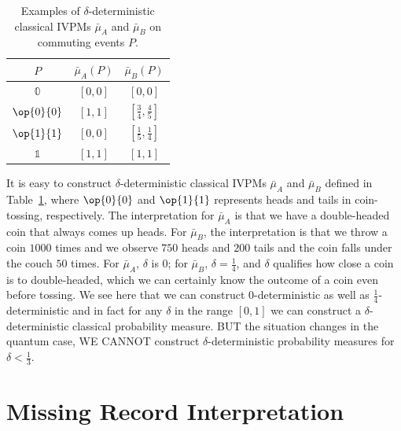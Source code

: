 \documentclass[english,reprint, aps, prl,superscriptaddress, showpacs,
showkeys, longbibliography, amsmath, amssymb, floatfix]{revtex4-1}
\theoremstyle{plain}
\theoremstyle{definition}
\newcommand{\imposs}{\ensuremath{\left[0,0\right]}}
\newcommand{\necess}{\ensuremath{\left[1,1\right]}}
\newcommand{\proj}[1]{\op{#1}{#1}}
\begin{document}
\begin{table}
\noindent \centering{}\caption{\label{tab:classical-IVPMs}Examples of $\delta$-deterministic classical
IVPMs $\bar{\mu}_{A}$ and $\bar{\mu}_{B}$ on commuting events $P$.}
\begin{tabular}{ccc}
\toprule 
\addlinespace
$P$  & $\bar{\mu}_{A}(P)$  & $\bar{\mu}_{B}(P)$ \tabularnewline
\midrule
\midrule 
\addlinespace
$\mathbb{0}$  & $\imposs$  & $\imposs$ \tabularnewline
\midrule 
\addlinespace
$\proj{0}$  & $\necess$  & $\left[\frac{3}{4},\frac{4}{5}\right]$ \tabularnewline
\midrule 
\addlinespace
$\proj{1}$  & $\imposs$  & $\left[\frac{1}{5},\frac{1}{4}\right]$ \tabularnewline
\midrule 
\addlinespace
$\mathbb{1}$  & $\necess$  & $\necess$ \tabularnewline
\bottomrule
\end{tabular}
\end{table}

\noindent It is easy to construct $\delta$-deterministic classical
IVPMs $\bar{\mu}_{A}$ and $\bar{\mu}_{B}$ defined in Table~\ref{tab:classical-IVPMs},
where $\proj{0}$ and $\proj{1}$ represents heads and tails in coin-tossing,
respectively. The interpretation for $\bar{\mu}_{A}$ is that we have
a double-headed coin that always comes up heads. For $\bar{\mu}_{B}$,
the interpretation is that we throw a coin $1000$ times and we observe
$750$ heads and $200$ tails and the coin falls under the couch $50$
times. For $\bar{\mu}_{A}$, $\delta$ is $0$; for $\bar{\mu}_{B}$,
$\delta=\frac{1}{4}$, and $\delta$ qualifies how close a coin is
to double-headed, which we can certainly know the outcome of a coin
even before tossing. We see here that we can construct $0$-deterministic
as well as $\frac{1}{4}$-deterministic and in fact for any $\delta$
in the range $\left[0,1\right]$ we can construct a $\delta$-deterministic
classical probability measure. BUT the situation changes in the quantum
case, WE CANNOT construct $\delta$-deterministic probability measures
for $\delta<\frac{1}{3}$.

\section{Missing Record Interpretation}
\end{document}
